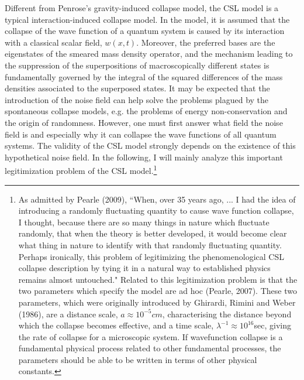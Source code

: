 Different from Penrose's gravity-induced  collapse model, the CSL model is a typical interaction-induced collapse model. In the model, it is assumed that the collapse of the wave function of a quantum system is caused by its interaction with a classical scalar field, $w(x, t)$. Moreover, the preferred bases are the eigenstates of the smeared mass density operator, and the mechanism leading to the suppression of the superpositions of macroscopically different states is fundamentally governed by the integral of the squared differences of the mass densities associated to the superposed states. It may be expected that the introduction of the noise field can help solve the problems plagued by the spontaneous collapse models, e.g. the problems of energy non-conservation and the origin of randomness. However, one must first answer what field the noise field is and especially why it can collapse the wave functions of all quantum systems. The validity of the CSL model strongly depends on the existence of this hypothetical noise field. In the following, I will mainly analyze this important legitimization problem of the CSL model.\footnote{As admitted by Pearle (2009), ``When, over 35 years ago, ... I had the idea of introducing a randomly fluctuating quantity to cause wave function collapse, I thought, because there are so many things in nature which fluctuate randomly, that when the theory is better developed, it would become clear what thing in nature to identify with that randomly fluctuating quantity. Perhaps ironically, this problem of legitimizing the phenomenological CSL collapse description by tying it in a natural way to established physics remains almost untouched." Related to this legitimization problem is that the two parameters which specify the model are ad hoc (Pearle, 2007). These two parameters, which were originally introduced by Ghirardi, Rimini and Weber (1986), are a distance scale, $a \approx 10^{-5}cm$, characterising the distance beyond which the collapse becomes effective, and a time scale,  $\lambda^{-1} \approx 10^{16}$sec, giving the rate of collapse for a microscopic system. If wavefunction collapse is a fundamental physical process related to other fundamental processes, the parameters should be able to be written in terms of other physical constants.}

